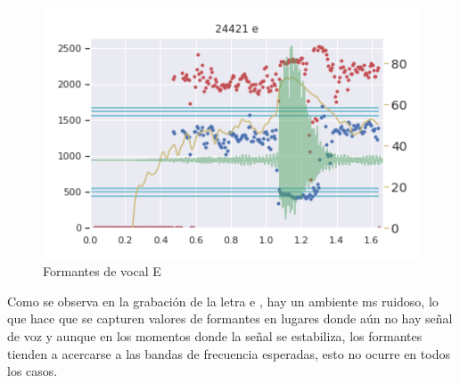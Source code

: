 \begin{figure}[H]
\caption{Formantes de vocal E}
\label{img:formantes_e}
\includegraphics[width=\textwidth]{imagenes/04_02_e.png}
\end{figure}


Como se observa en la grabación de la letra e , hay un ambiente ms ruidoso, lo que hace que se capturen valores de formantes en lugares donde aún no hay señal de voz y aunque en los momentos donde la señal se estabiliza, los formantes tienden a acercarse a las bandas de frecuencia esperadas, esto no ocurre en todos los casos. 